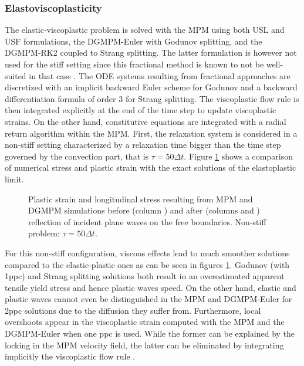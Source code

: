 \subsubsection{Elastoviscoplasticity}
The elastic-viscoplastic problem is solved with the MPM using both USL and USF formulations, the DGMPM-Euler with Godunov splitting, and the DGMPM-RK2 coupled to Strang splitting. The latter formulation is however not used for the stiff setting since this fractional method is known to not be well-suited in that case \cite{Thomas_EVP,Leveque_stiff}. The ODE systems resulting from fractional approaches are discretized with an implicit backward Euler scheme for Godunov and a backward differentiation formula of order 3 for Strang splitting. The viscoplastic flow rule is then integrated explicitly at the end of the time step to update viscoplastic strains. On the other hand, constitutive equations are integrated with a radial return algorithm \cite{Simo} within the MPM. First, the relaxation system is considered in a non-stiff setting characterized by a relaxation time bigger than the time step governed by the convection part, that is $\tau=50\Delta t$. Figure \ref{fig:nonstiff_elastoviscoplastic_RP} shows a comparison of numerical stress and plastic strain with the exact solutions of the elastoplastic limit.
\begin{figure}[h!]
  \centering
  { \label{subfig:evp_nonstiff1}}
  { \label{subfig:evp_nonstiff2}}
  { \label{subfig:evp_nonstiff3}}
  {}
  \caption{Plastic strain and longitudinal stress resulting from MPM and DGMPM simulations before (column ) and after (columns  and ) reflection of incident plane waves on the free boundaries. Non-stiff problem: $\tau=50\Delta t$.}
  \label{fig:nonstiff_elastoviscoplastic_RP}
\end{figure}
For this non-stiff configuration, viscous effects lead to much smoother solutions compared to the elastic-plastic ones as can be seen in figures \ref{fig:nonstiff_elastoviscoplastic_RP}. Godunov (with 1ppc) and Strang splitting solutions both result in an overestimated apparent tensile yield stress and hence plastic waves speed. On the other hand, elastic and plastic waves cannot even be distinguished in the MPM and DGMPM-Euler for 2ppc solutions due to the diffusion they suffer from. Furthermore, local overshoots appear in the viscoplastic strain computed with the MPM and the DGMPM-Euler when one ppc is used. While the former can be explained by the locking in the MPM velocity field, the latter can be eliminated by integrating implicitly the viscoplastic flow rule \cite{Thomas_EVP}.

